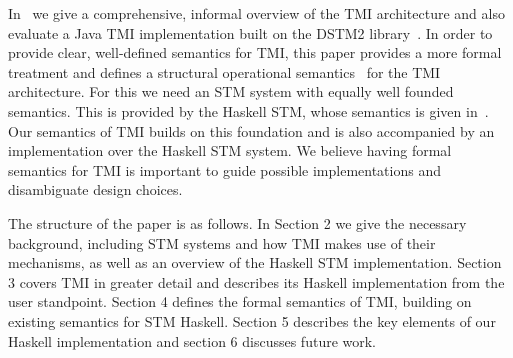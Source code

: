 In~\cite{tmi} we give a comprehensive, informal overview of the TMI architecture and also evaluate 
a Java TMI implementation built on the DSTM2 library~\cite{hlm06}.
In order to provide clear, well-defined semantics for TMI, this paper provides a more
formal treatment and defines a structural operational semantics~\cite{Plotkin04a} 
for the TMI architecture.
For this we need an STM system with equally well founded semantics. This is provided by the Haskell
STM, whose semantics is given in~\cite{haskellstm}. Our semantics of TMI builds on this foundation
and is also accompanied by an implementation over the Haskell STM system. We believe having formal
semantics for TMI is important to guide possible implementations and disambiguate design choices.

The structure of the paper is as follows. In Section 2 we give the necessary background, including
STM systems and how TMI makes use of their mechanisms, as well as an overview of the Haskell STM
implementation. Section 3 covers TMI in greater detail and describes its Haskell implementation
from the user standpoint. Section 4 defines the formal semantics of TMI, building on existing
semantics for STM Haskell. Section 5 describes the key elements of our Haskell implementation
and section 6 discusses future work.

